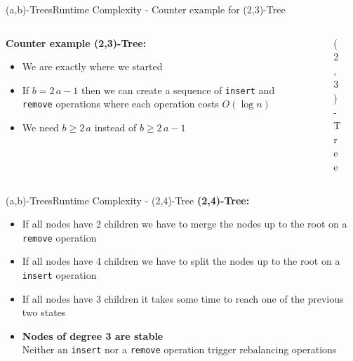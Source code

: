 \begin{frame}{(a,b)-Trees}{Runtime Complexity - Counter example for (2,3)-Tree}
  \begin{columns}
    \begin{column}{0.6\linewidth}
      \textbf{Counter example (2,3)-Tree:}
      \begin{itemize}
        \item
          We are exactly where we started
        \item<2->
          If {\color{MainA}$b=2\,a-1$} then we can create a sequence of
          \texttt{\color{MainA}insert} and
          \texttt{\color{MainA}remove} operations where each operation
          costs {\color{MainA}$O(\log n)$}
        \item<3->
          We need {\color{MainA}$b \geq 2 \, a$} instead of
          {\color{MainA}$b \geq 2 \, a - 1$}
      \end{itemize}
    \end{column}
    \begin{column}{0.4\linewidth}
      \begin{figure}
        \begin{adjustbox}{width=\linewidth}
          
        \end{adjustbox}
        \vspace{-1.5em}
        \label{fig:a_b_tree:2_3_tree_10}
        \caption{(2,3)-Tree}
      \end{figure}
    \end{column}
  \end{columns}
\end{frame}


\begin{frame}{(a,b)-Trees}{Runtime Complexity - (2,4)-Tree}
  \textbf{(2,4)-Tree:}
  \begin{itemize}
    \item<2->
      If all nodes have {\color{MainA}2 children} we have to
      {\color{MainA}merge} the nodes up to the root on a
      \texttt{\color{MainA}remove} operation
    \item<3->
      If all nodes have {\color{MainA}4 children} we have to
      {\color{MainA}split} the nodes up to the root on a
      \texttt{\color{MainA}insert} operation
    \item<4->
      If all nodes have {\color{MainA}3 children} it takes some time
      to reach one of the previous two states
    \item<5->[$\Rightarrow$]
      \textbf{Nodes of degree 3 are stable}\\
      Neither an \texttt{\color{MainA}insert} nor a
      \texttt{\color{MainA}remove} operation trigger rebalancing
      operations
  \end{itemize}
\end{frame}

